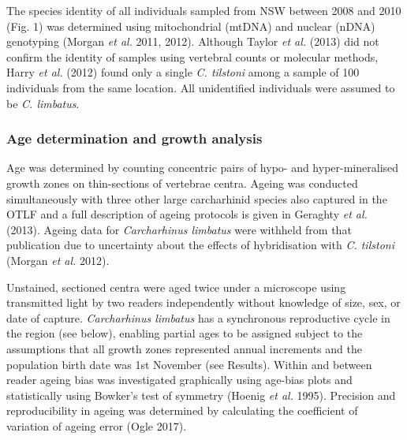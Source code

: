 \documentclass[]{article}
\begin{document}
The species identity of all individuals sampled from NSW between 2008
and 2010 (Fig. 1) was determined using mitochondrial (mtDNA) and nuclear
(nDNA) genotyping (Morgan \emph{et al.} 2011, 2012). Although Taylor
\emph{et al.} (2013) did not confirm the identity of samples using
vertebral counts or molecular methods, Harry \emph{et al.} (2012) found
only a single \emph{C. tilstoni} among a sample of 100 individuals from
the same location. All unidentified individuals were assumed to be
\emph{C. limbatus}.

\hypertarget{age-determination-and-growth-analysis}{%
\subsubsection{Age determination and growth
analysis}\label{age-determination-and-growth-analysis}}

Age was determined by counting concentric pairs of hypo- and
hyper-mineralised growth zones on thin-sections of vertebrae centra.
Ageing was conducted simultaneously with three other large carcharhinid
species also captured in the OTLF and a full description of ageing
protocols is given in Geraghty \emph{et al.} (2013). Ageing data for
\emph{Carcharhinus limbatus} were withheld from that publication due to
uncertainty about the effects of hybridisation with \emph{C. tilstoni}
(Morgan \emph{et al.} 2012).

Unstained, sectioned centra were aged twice under a microscope using
transmitted light by two readers independently without knowledge of
size, sex, or date of capture. \emph{Carcharhinus limbatus} has a
synchronous reproductive cycle in the region (see below), enabling
partial ages to be assigned subject to the assumptions that all growth
zones represented annual increments and the population birth date was
1st November (see Results). Within and between reader ageing bias was
investigated graphically using age-bias plots and statistically using
Bowker's test of symmetry (Hoenig \emph{et al.} 1995). Precision and
reproducibility in ageing was determined by calculating the coefficient
of variation of ageing error (Ogle 2017).
\end{document}
